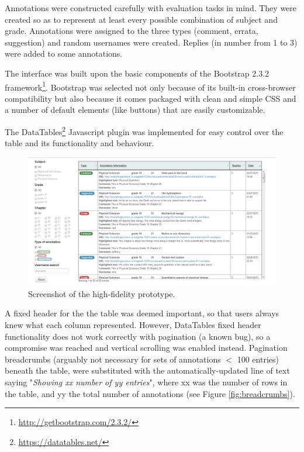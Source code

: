 Annotations were constructed carefully with evaluation tasks in mind. They were created so as to represent at least every possible combination of subject and grade. Annotations were assigned to the three types (comment, errata, suggestion) and random usernames were created. Replies (in number from 1 to 3) were added to some annotations.

The interface was built upon the basic components of the Bootstrap 2.3.2 framework\footnote{\href{http://getbootstrap.com/2.3.2/}{http://getbootstrap.com/2.3.2/}}. Bootstrap was selected not only because of its built-in cross-browser compatibility but also because it comes packaged with clean and simple CSS and a number of default elements (like buttons) that are easily customizable. 

The DataTables\footnote{\href{https://datatables.net/}{https://datatables.net/}} Javascript plugin was implemented for easy control over the table and its functionality and behaviour. 

\begin{figure}
    \centering
    \includegraphics[width=\textwidth]{Figures/V1/HiFi1mainview.PNG}
 \caption{Screenshot of the high-fidelity prototype.}
 \label{fig:HifiMain}
\end{figure}

A fixed header for the the table was deemed important, so that users always knew what each column represented. However, DataTables fixed header functionality does not work correctly with pagination (a known bug), so a compromise was reached and vertical scrolling was enabled instead. Pagination breadcrumbs (arguably not necessary for sets of annotations $<$ 100 entries) beneath the table, were substituted with the automatically-updated line of text saying "\textit{Showing xx number of yy entries}", where xx was the number of rows in the table, and yy the total number of annotations (see Figure \ref{fig:breadcrumbs}).


